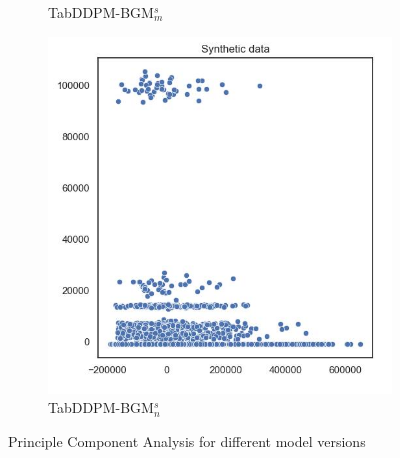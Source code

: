 \begin{figure}[h]
\begin{subfigure}{0.3\textwidth}
		\caption{TabDDPM-BGM$^{s}_m$}
		\label{fig_a:pca_TabDDPMBM}
    \end{subfigure}
	\begin{subfigure}{0.3\textwidth}
		\includegraphics[width=\textwidth]{images/pca/tab-ddpm-bgm-simTune-none.jpg}
		\caption{TabDDPM-BGM$^{s}_n$}
    \end{subfigure}
    \caption[PCA plots Experiment Models]{Principle Component Analysis for different model versions}
    \label{fig_a:pca_diff}
\end{figure}
\newpage

